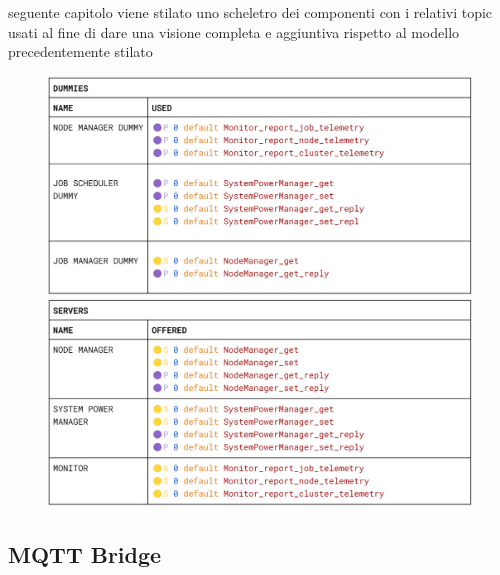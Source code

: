 seguente capitolo viene stilato uno scheletro dei componenti con i relativi topic usati al fine di dare una visione completa e aggiuntiva rispetto al modello precedentemente stilato  
\begin{figure}[H]
    \centering
    \includegraphics[width=\textwidth]{./img/dummies_skeleton.png}
    \includegraphics[width=\textwidth]{./img/server_skeleton.png}
\end{figure}

\subsection{MQTT Bridge}